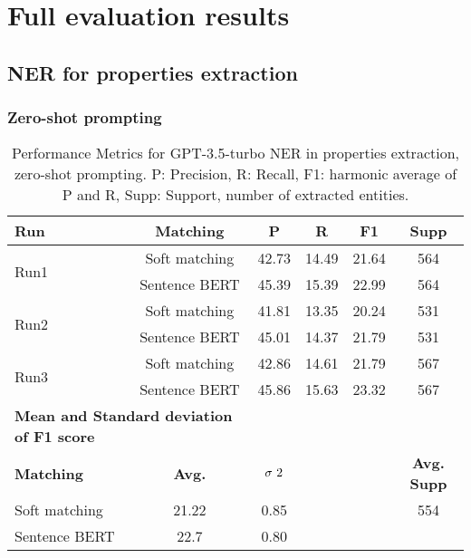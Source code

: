 

\section{Full evaluation results}

\subsection{NER for properties extraction}

\subsubsection{Zero-shot prompting}
\begin{table}[htbp]
\small
  \centering
  \caption{Performance Metrics for GPT-3.5-turbo NER in properties extraction, zero-shot prompting. P: Precision, R: Recall, F1: harmonic average of P and R, Supp: Support, number of extracted entities.}
  \begin{tabular}{lccccc}
    \toprule
    \textbf{Run} & \textbf{Matching} & \textbf{P} & \textbf{R} & \textbf{F1} & \textbf{Supp} \\
    \midrule
    \multirow{2}{*}{Run1} & Soft matching & 42.73 & 14.49 & 21.64 & 564 \\
    & Sentence BERT & 45.39 & 15.39 & 22.99 & 564 \\
    \midrule
    \multirow{2}{*}{Run2} & Soft matching & 41.81 & 13.35 & 20.24 & 531 \\
    & Sentence BERT & 45.01 & 14.37 & 21.79 & 531 \\
    \midrule
    \multirow{2}{*}{Run3} & Soft matching & 42.86 & 14.61 & 21.79 & 567 \\
    & Sentence BERT & 45.86 & 15.63 & 23.32 & 567 \\
    \midrule
    \multicolumn{2}{l}{\textbf{Mean and Standard deviation of F1 score}} & & & & \\
    \midrule
    \textbf{Matching} & \textbf{Avg.} & $\sigma\textsuperscript{2}$ & & & \textbf{Avg. Supp}\\
    Soft matching & 21.22 & 0.85 & & & 554 \\
    Sentence BERT & 22.7 & 0.80 & & & \\
    \bottomrule
  \end{tabular}
\end{table}


